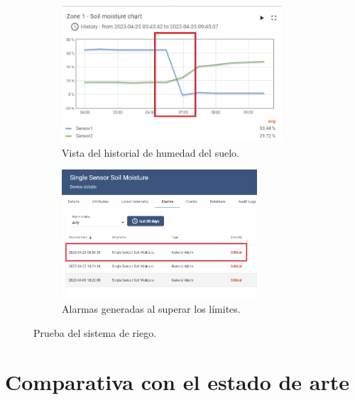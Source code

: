 \begin{figure}[!h]
     \centering
       \begin{subfigure}[b]{0.8\textwidth}
	    \centering
		 \includegraphics[width=0.9\textwidth]{./Figures/chapter4/soil_chart.jpg}
		\caption{Vista del historial de humedad del suelo.}
		\label{fig:soil_graph}
     \end{subfigure}
          \hfill
     \begin{subfigure}[b]{0.80\textwidth}
		\centering
		\includegraphics[width=0.80\textwidth]{./Figures/chapter4/soil_alarm.jpg}
		\caption{Alarmas generadas al superar los límites.}
		\label{fig:soil_alarm}
     \end{subfigure}
     \hfill
        \caption[Prueba del sistema de riego]{Prueba del sistema de riego.}
        \label{fig:tb_riego}
\end{figure}

\pagebreak
\section{Comparativa con el estado de arte}
\label{sec:Comparativa con el estado de arte}

